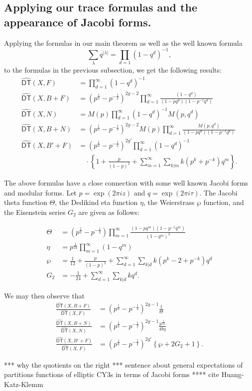 \documentclass[12pt]{amsart}
\newcommand{\half}{\frac{1}{2}}
\theoremstyle{definition}
\newcommand{\DThat}{\operatorname{\widehat{\mathsf{DT}}}}
\begin{document}
\subsection{Applying our trace formulas and the appearance of Jacobi forms.}
Applying the formulas in our main theorem as well as the well known
formula
\[
\sum_{\lambda} q^{|\lambda |}= \prod_{d=1}(1-q^{d})^{-1},
\]
to the formulas in the previous subsection, we get the following
results:
\begin{align*}
\DThat (X,F)&= \prod_{d=1}^{\infty} (1-q^{d})^{-1}\\
\DThat (X,B+F)&= \left(p^{\half}-p^{-\half} \right)^{2g-2} \prod_{d=1}^{\infty}
\frac{(1-q^{d})}{(1-pq^{d})(1-p^{-1}q^{d})}\\
\DThat (X,N) &= M(p)\prod_{d=1}^{\infty} (1-q^{d})^{-1} M(p,q^{d})\\
\DThat (X,B+N) &=  \left(p^{\half}-p^{-\half} \right)^{2g-2} M(p)
\prod_{d=1}^{\infty} \frac{M(p,q^{d})}{(1-pq^{d})(1-p^{-1}q^{d})}\\
\DThat (X,B'+F) &=  \left(p^{\half}-p^{-\half}
\right)^{2g'}\prod_{d=1}^{\infty}(1-q^{d})^{-1}\\
&\quad \cdot 
\left\{1+\frac{p}{(1-p)^{2}}+\sum_{m=1}^{\infty} \sum_{k|m}
k(p^{k}+p^{-k})q^{m} \right\}. 
\end{align*}

The above formulas have a close connection with some well known Jacobi
forms and modular forms. Let $p=\exp\left(2\pi iz \right)$ and
$q=\exp\left(2\pi i\tau \right)$. The Jacobi theta function $\Theta$,
the Dedikind eta function $\eta$, the Weierstrass $\wp$ function, and
the Eisenstein series $G_{2}$ are given as follows:

\begin{align*}
\Theta &= \left(p^{\half}-p^{-\half} \right) \prod_{m=1}^{\infty}
\frac{(1-pq^{m})(1-p^{-1}q^{m})}{(1-q^{m})^{2}}\\
\eta &= p^{\frac{1}{24}}\prod_{m=1}^{\infty}(1-q^{m})\\
\wp &= \frac{1}{12} +\frac{p}{(1-p)^{2}} +\sum_{d=1}^{\infty}
\sum_{k|d} k(p^{k}-2+p^{-k}) q^{d}\\
G_{2} &= -\frac{1}{24} + \sum_{d=1}^{\infty} \sum_{k|d} k q^{d}.
\end{align*}

We may then observe that 
\begin{align*}
\frac{\DThat (X,B+F)}{\DThat (X,F)} &= \left(p^{\half}-p^{-\half}
\right)^{2g-1} \frac{1}{\Theta} \\
\frac{\DThat (X,B+N)}{\DThat (X,N)} &= \left(p^{\half}-p^{-\half}
\right)^{2g-1} \frac{p^{\frac{1}{24}}}{\Theta \eta } \\
\frac{\DThat (X,B'+F)}{\DThat (X,F)} &= \left(p^{\half}-p^{-\half}
\right)^{2g'} \left\{\wp +2G_{2} +1 \right\}.
\end{align*}

*** why the quotients on the right *** sentence about general
expectations of partitions functions of elliptic CY3s in terms of
Jacobi forms ****  cite Huang-Katz-Klemm

       


\end{document}
